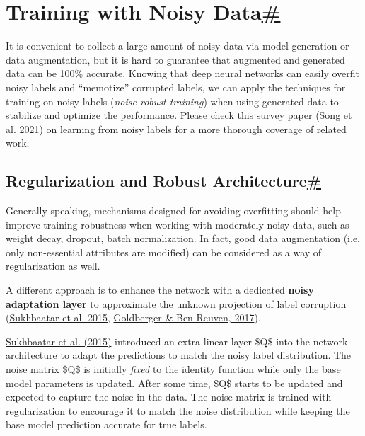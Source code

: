 \section{\texorpdfstring{Training with Noisy Data\hyperref[training-with-noisy-data]{\#}}{Training with Noisy Data\#}}\label{training-with-noisy-data}

It is convenient to collect a large amount of noisy data via model generation or data augmentation, but it is hard to guarantee that augmented and generated data can be 100\% accurate. Knowing that deep neural networks can easily overfit noisy labels and ``memotize'' corrupted labels, we can apply the techniques for training on noisy labels (\emph{noise-robust training}) when using generated data to stabilize and optimize the performance. Please check this \href{https://arxiv.org/abs/2007.08199}{survey paper (Song et al. 2021)} on learning from noisy labels for a more thorough coverage of related work.

\subsection{\texorpdfstring{Regularization and Robust Architecture\hyperref[regularization-and-robust-architecture]{\#}}{Regularization and Robust Architecture\#}}\label{regularization-and-robust-architecture}

Generally speaking, mechanisms designed for avoiding overfitting should help improve training robustness when working with moderately noisy data, such as weight decay, dropout, batch normalization. In fact, good data augmentation (i.e. only non-essential attributes are modified) can be considered as a way of regularization as well.

A different approach is to enhance the network with a dedicated \textbf{noisy adaptation layer} to approximate the unknown projection of label corruption (\href{https://arxiv.org/abs/1406.2080}{Sukhbaatar et al. 2015}, \href{https://openreview.net/forum?id=H12GRgcxg}{Goldberger \& Ben-Reuven, 2017}).

\href{https://arxiv.org/abs/1406.2080}{Sukhbaatar et al. (2015)} introduced an extra linear layer \$Q\$ into the network architecture to adapt the predictions to match the noisy label distribution. The noise matrix \$Q\$ is initially \emph{fixed} to the identity function while only the base model parameters is updated. After some time, \$Q\$ starts to be updated and expected to capture the noise in the data. The noise matrix is trained with regularization to encourage it to match the noise distribution while keeping the base model prediction accurate for true labels.


